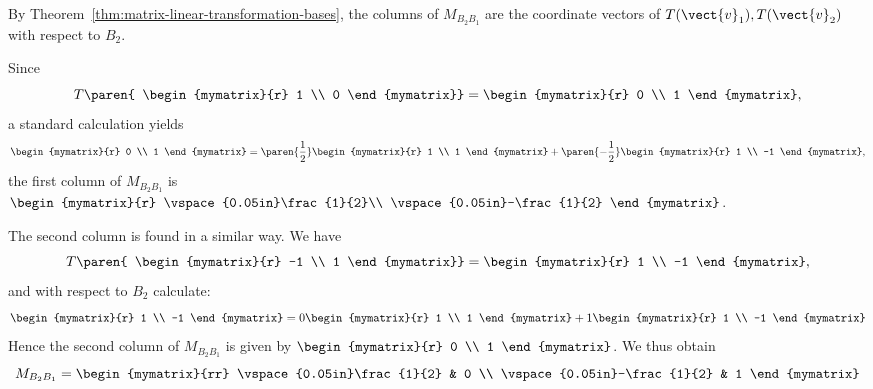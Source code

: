 \begin{solution}
By Theorem~\ref{thm:matrix-linear-transformation-bases}, the columns of $M_{B_{2} B_{1}}$ are the
coordinate vectors of $T(\vect{v}_{1}), T(\vect{v}_{2})$ with respect
to $B_2$.

Since \[
T \paren{
\begin{mymatrix}{r}
1 \\
0
\end{mymatrix}}
= \begin{mymatrix}{r}
0 \\
1
\end{mymatrix} ,\]
a standard calculation yields
\[
 \begin{mymatrix}{r}
0 \\
1
\end{mymatrix}
 =
\paren{\frac{1}{2}}\begin{mymatrix}{r}
1 \\
1
\end{mymatrix}
+
\paren{-\frac{1}{2}}
\begin{mymatrix}{r}
1 \\
-1
\end{mymatrix},
\]
the first column of $M_{B_{2} B_{1}}$ is $\begin{mymatrix}{r}
\vspace{0.05in}\frac{1}{2}\\
\vspace{0.05in}-\frac{1}{2}
\end{mymatrix}$.

The second column is found in a similar way. We have
\[
T \paren{
\begin{mymatrix}{r}
-1 \\
1
\end{mymatrix}}
= \begin{mymatrix}{r}
1 \\
-1
\end{mymatrix} , \]
and with respect to $B_2$ calculate:
\[
\begin{mymatrix}{r}
1 \\
-1
\end{mymatrix}
=
0 \begin{mymatrix}{r}
1 \\
1
\end{mymatrix}
+
1
\begin{mymatrix}{r}
1 \\
-1
\end{mymatrix}
\]
Hence the second column of $M_{B_{2} B_{1}}$ is given by $\begin{mymatrix}{r}
0 \\
1
\end{mymatrix}$. We thus obtain
\[
M_{B_{2} B_{1}} = \begin{mymatrix}{rr}
\vspace{0.05in}\frac{1}{2} & 0 \\
\vspace{0.05in}-\frac{1}{2} & 1
\end{mymatrix} \]


\end{solution}
